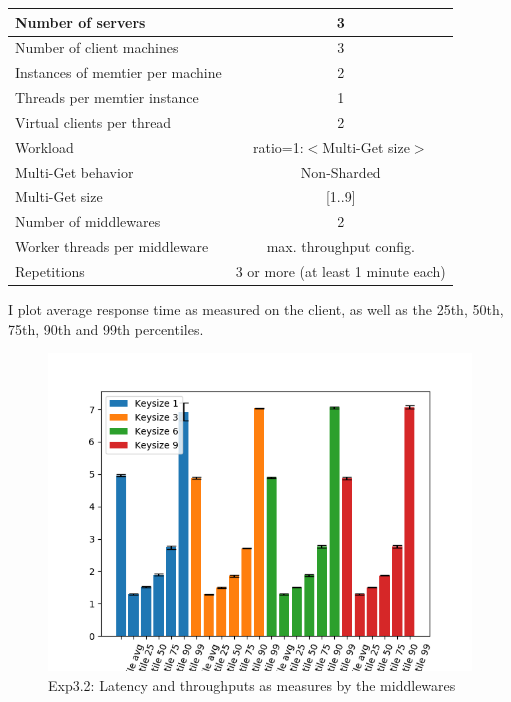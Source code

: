 \documentclass[11pt,a4paper]{article}
\begin{document}
\begin{center}
	\scriptsize{
		\begin{tabular}{|l|c|}
			\hline Number of servers                & 3                       \\ 
			\hline Number of client machines        & 3                       \\ 
			\hline Instances of memtier per machine & 2                       \\ 
			\hline Threads per memtier instance     & 1                       \\
			\hline Virtual clients per thread       & 2                		 \\ 
			\hline Workload                         & ratio=1:$<$Multi-Get size$>$              \\
			\hline Multi-Get behavior               & Non-Sharded             \\
			\hline Multi-Get size                   & [1..9]                  \\
			\hline Number of middlewares            & 2                       \\
			\hline Worker threads per middleware    & max. throughput config. \\
			\hline Repetitions                      & 3 or more (at least 1 minute each)               \\ 
			\hline 
		\end{tabular}
	} 
\end{center}

I plot average response time as measured on the client, as well as the 25th, 50th, 75th, 90th and 99th percentiles.

\begin{figure}[H]
\centering
\includegraphics[width=\textwidth]{img/exp5_1/exp5_1_client_percentile_plots_sharded_False.png}
\caption{Exp3.2: Latency and throughputs as measures by the middlewares}
\label{fig:test}
\end{figure}
\end{document}
